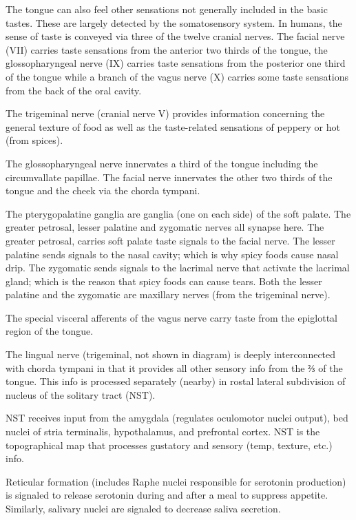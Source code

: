 The tongue can also feel other sensations not generally included in the basic tastes. These are largely detected by the somatosensory system. In humans, the sense of taste is conveyed via three of the twelve cranial nerves. The facial nerve (VII) carries taste sensations from the anterior two thirds of the tongue, the glossopharyngeal nerve (IX) carries taste sensations from the posterior one third of the tongue while a branch of the vagus nerve (X) carries some taste sensations from the back of the oral cavity.

The trigeminal nerve (cranial nerve V) provides information concerning the general texture of food as well as the taste-related sensations of peppery or hot (from spices).

The glossopharyngeal nerve innervates a third of the tongue including the circumvallate papillae. The facial nerve innervates the other two thirds of the tongue and the cheek via the chorda tympani.

The pterygopalatine ganglia are ganglia (one on each side) of the soft palate. The greater petrosal, lesser palatine and zygomatic nerves all synapse here. The greater petrosal, carries soft palate taste signals to the facial nerve. The lesser palatine sends signals to the nasal cavity; which is why spicy foods cause nasal drip. The zygomatic sends signals to the lacrimal nerve that activate the lacrimal gland; which is the reason that spicy foods can cause tears. Both the lesser palatine and the zygomatic are maxillary nerves (from the trigeminal nerve).

The special visceral afferents of the vagus nerve carry taste from the epiglottal region of the tongue.

The lingual nerve (trigeminal, not shown in diagram) is deeply interconnected with chorda tympani in that it provides all other sensory info from the ⅔ of the tongue. This info is processed separately (nearby) in rostal lateral subdivision of nucleus of the solitary tract (NST).

NST receives input from the amygdala (regulates oculomotor nuclei output), bed nuclei of stria terminalis, hypothalamus, and prefrontal cortex. NST is the topographical map that processes gustatory and sensory (temp, texture, etc.) info.

Reticular formation (includes Raphe nuclei responsible for serotonin production) is signaled to release serotonin during and after a meal to suppress appetite. Similarly, salivary nuclei are signaled to decrease saliva secretion.

